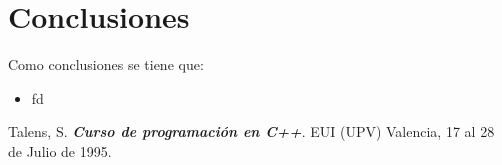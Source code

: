 \section{Conclusiones}


Como conclusiones se tiene que:

\begin{itemize}
\item fd
\end{itemize}


\begin{thebibliography}{IEEE}
 Talens, S. \textbf{\textit{Curso de programación en C++}}. EUI (UPV) Valencia, 17 al 28 de Julio de 1995. 
\end{thebibliography}
